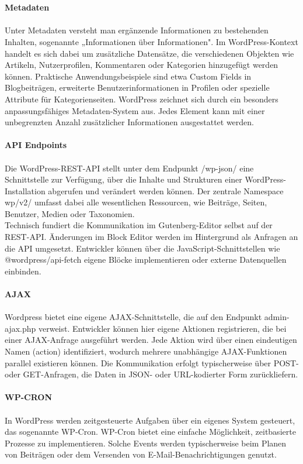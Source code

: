 \\
\\
\textbf{Metadaten}\\\\
Unter Metadaten versteht man ergänzende Informationen zu bestehenden Inhalten, sogenannte „Informationen über Informationen".
Im WordPress-Kontext handelt es sich dabei um zusätzliche Datensätze, die verschiedenen Objekten wie Artikeln, Nutzerprofilen, Kommentaren oder Kategorien hinzugefügt werden können.
Praktische Anwendungsbeispiele sind etwa Custom Fields in Blogbeiträgen, erweiterte Benutzerinformationen in Profilen oder spezielle Attribute für Kategorienseiten.
WordPress zeichnet sich durch ein besonders anpassungsfähiges Metadaten-System aus.
Jedes Element kann mit einer unbegrenzten Anzahl zusätzlicher Informationen ausgestattet werden.
\\
\\
\textbf{API Endpoints}\\\\
Die WordPress-REST-API stellt unter dem Endpunkt /wp-json/ eine Schnittstelle zur Verfügung, über die Inhalte und Strukturen einer WordPress-Installation abgerufen und verändert werden können.
Der zentrale Namespace wp/v2/ umfasst dabei alle wesentlichen Ressourcen, wie Beiträge, Seiten, Benutzer, Medien oder Taxonomien.
\\
Technisch fundiert die Kommunikation im Gutenberg-Editor selbst auf der REST-API.
Änderungen im Block Editor werden im Hintergrund als Anfragen an die API umgesetzt.
Entwickler können über die JavaScript-Schnittstellen wie @wordpress/api-fetch eigene Blöcke implementieren oder externe Datenquellen einbinden.
\\
\\
\textbf{AJAX}\\\\
Wordpress bietet eine eigene AJAX-Schnittstelle, die auf den Endpunkt admin-ajax.php verweist.
Entwickler können hier eigene Aktionen registrieren, die bei einer AJAX-Anfrage ausgeführt werden.
Jede Aktion wird über einen eindeutigen Namen (action) identifiziert, wodurch mehrere unabhängige AJAX-Funktionen parallel existieren können.
Die Kommunikation erfolgt typischerweise über POST- oder GET-Anfragen, die Daten in JSON- oder URL-kodierter Form zurückliefern.
\\
\\
\textbf{WP-CRON}\\\\
In WordPress werden zeitgesteuerte Aufgaben über ein eigenes System gesteuert, das sogenannte WP-Cron.
WP-Cron bietet eine einfache Möglichkeit, zeitbasierte Prozesse zu implementieren.
Solche Events werden typischerweise beim Planen von Beiträgen oder dem Versenden von E-Mail-Benachrichtigungen genutzt.

